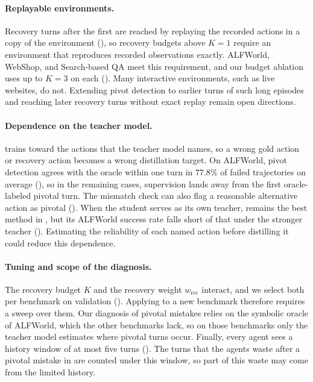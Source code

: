 \paragraph{Replayable environments.} Recovery turns after the first are reached by replaying the recorded actions in a copy of the environment (), so recovery budgets above $K = 1$ require an environment that reproduces recorded observations exactly. ALFWorld, WebShop, and Search-based QA meet this requirement, and our budget ablation uses up to $K = 3$ on each (). Many interactive environments, such as live websites, do not. Extending pivot detection to earlier turns of such long episodes and reaching later recovery turns without exact replay remain open directions.

\paragraph{Dependence on the teacher model.} \method{} trains toward the actions that the teacher model names, so a wrong gold action or recovery action becomes a wrong distillation target. On ALFWorld, pivot detection agrees with the oracle within one turn in $77.8\%$ of failed trajectories on average (), so in the remaining cases, supervision lands away from the first oracle-labeled pivotal turn. The mismatch check can also flag a reasonable alternative action as pivotal (). When the student serves as its own teacher, \method{} remains the best method in , but its ALFWorld success rate falls short of that under the stronger teacher (). Estimating the reliability of each named action before distilling it could reduce this dependence.

\paragraph{Tuning and scope of the diagnosis.} The recovery budget $K$ and the recovery weight $w_\text{rec}$ interact, and we select both per benchmark on validation (). Applying \method{} to a new benchmark therefore requires a sweep over them. Our diagnosis of pivotal mistakes relies on the symbolic oracle of ALFWorld, which the other benchmarks lack, so on those benchmarks only the teacher model estimates where pivotal turns occur. Finally, every agent sees a history window of at most five turns (). The turns that the agents waste after a pivotal mistake in  are counted under this window, so part of this waste may come from the limited history.
